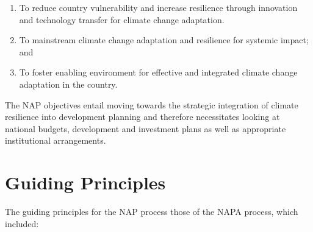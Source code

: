 \documentclass[
]{book}
\begin{document}
\begin{enumerate}
\def\labelenumi{(\arabic{enumi})}
\item
  To reduce country vulnerability and increase resilience through innovation and technology transfer for climate change adaptation.
\item
  To mainstream climate change adaptation and resilience for systemic impact; and
\item
  To foster enabling environment for effective and integrated climate change adaptation in the country.
\end{enumerate}

The NAP objectives entail moving towards the strategic integration of climate resilience into development planning and therefore necessitates looking at national budgets, development and investment plans as well as appropriate institutional arrangements.

\hypertarget{guiding-principles}{%
\section{Guiding Principles}\label{guiding-principles}}

The guiding principles for the NAP process those of the NAPA process, which included:

\providecommand{\docline}[3]{\noalign{\global\setlength{\arrayrulewidth}{#1}}\arrayrulecolor[HTML]{#2}\cline{#3}}

\setlength{\tabcolsep}{2pt}

\renewcommand*{\arraystretch}{1.5}
\end{document}
